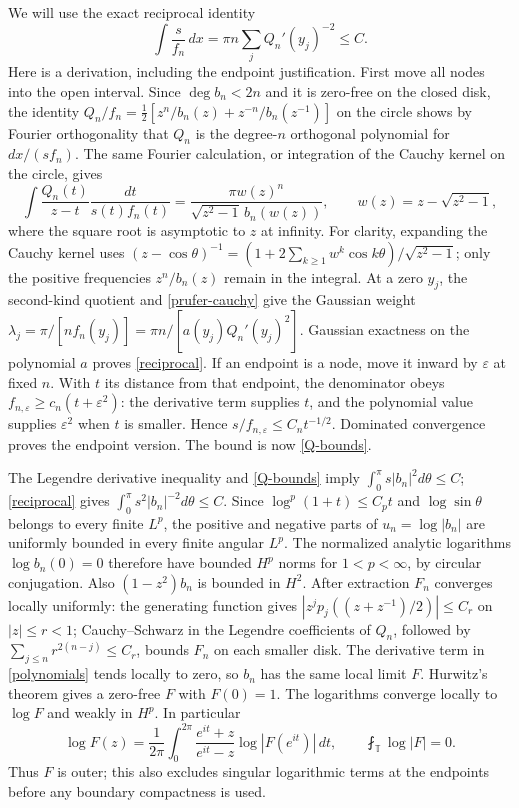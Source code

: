 \documentclass[a4paper,11pt]{amsart}
\theoremstyle{remark}\newtheorem{remark}[theorem]{Remark}
\newcommand{\T}{\mathbb T}
\newcommand{\dd}{\,d}
\begin{document}
We will use the exact reciprocal identity
\begin{equation}\label{reciprocal}
 \int\frac{s}{f_n}\dd x=\pi n\sum_j Q_n'(y_j)^{-2}\le C.
\end{equation}
Here is a derivation, including the endpoint justification. First move
all nodes into the open interval. Since $\deg b_n<2n$ and it is
zero-free on the closed disk, the identity
$Q_n/f_n=\tfrac12[z^n/b_n(z)+z^{-n}/b_n(z^{-1})]$ on the circle
shows by Fourier orthogonality that $Q_n$ is the degree-$n$
orthogonal polynomial for $dx/(sf_n)$. The same Fourier calculation,
or integration of the Cauchy kernel on the circle, gives
\begin{equation}\label{prufer-cauchy}
 \int\frac{Q_n(t)}{z-t}\frac{dt}{s(t)f_n(t)}
 =\frac{\pi w(z)^n}{\sqrt{z^2-1}\,b_n(w(z))},\qquad
 w(z)=z-\sqrt{z^2-1},
\end{equation}
where the square root is asymptotic to $z$ at infinity.
For clarity, expanding the Cauchy kernel uses
$(z-\cos\theta)^{-1}=(1+2\sum_{k\ge1}w^k\cos k\theta)/\sqrt{z^2-1}$;
only the positive frequencies $z^n/b_n(z)$ remain in the integral.
At a zero $y_j$, the second-kind quotient and
\eqref{prufer-cauchy} give the Gaussian weight
$\lambda_j=\pi/[n f_n(y_j)]=\pi n/[a(y_j)Q_n'(y_j)^2]$.
Gaussian exactness on the polynomial $a$ proves \eqref{reciprocal}.
If an endpoint is a node, move it inward by $\varepsilon$ at fixed
$n$. With $t$ its distance from that endpoint, the denominator obeys
$f_{n,\varepsilon}\ge c_n(t+\varepsilon^2)$: the derivative term
supplies $t$, and the polynomial value supplies $\varepsilon^2$
when $t$ is smaller. Hence $s/f_{n,\varepsilon}\le C_nt^{-1/2}$.
Dominated convergence proves the endpoint version. The bound is now
\eqref{Q-bounds}.

The Legendre derivative inequality and \eqref{Q-bounds} imply
$\int_0^\pi s|b_n|^2d\theta\le C$; \eqref{reciprocal} gives
$\int_0^\pi s^2|b_n|^{-2}d\theta\le C$.
Since $\log^p(1+t)\le C_pt$ and $\log\sin\theta$ belongs to every
finite $L^p$, the positive and negative parts of $u_n=\log|b_n|$
are uniformly bounded in every finite angular $L^p$.
The normalized analytic logarithms $\log b_n(0)=0$ therefore have
bounded $H^p$ norms for $1<p<\infty$, by circular conjugation.
Also $(1-z^2)b_n$ is bounded in $H^2$.
After extraction $F_n$ converges locally uniformly: the generating
function gives $|z^jp_j((z+z^{-1})/2)|\le C_r$ on $|z|\le r<1$;
Cauchy--Schwarz in the Legendre coefficients of $Q_n$, followed by
$\sum_{j\le n}r^{2(n-j)}\le C_r$, bounds $F_n$ on each smaller disk.
The derivative term in \eqref{polynomials} tends locally to zero,
so $b_n$ has the same local limit $F$. Hurwitz's theorem gives a
zero-free $F$ with $F(0)=1$. The logarithms converge locally to
$\log F$ and weakly in $H^p$.
In particular
\begin{equation}\label{outer}
 \log F(z)=\frac1{2\pi}\int_0^{2\pi}
 \frac{e^{it}+z}{e^{it}-z}\log|F(e^{it})|\dd t,
 \qquad \fint_\T\log|F|=0.
\end{equation}
Thus $F$ is outer; this also excludes singular logarithmic terms at
the endpoints before any boundary compactness is used.
\end{document}

